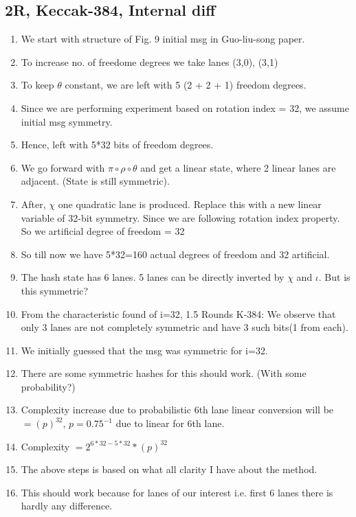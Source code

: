 \documentclass{article}
\begin{document}
\subsection{2R, Keccak-384, Internal diff}
\begin{enumerate}
    \item We start with structure of Fig. 9 initial msg in Guo-liu-song paper.
    \item To increase no. of freedome degrees we take lanes (3,0), (3,1)
    \item To keep $\theta$ constant, we are left with 5 (2 + 2 + 1) freedom degrees.
    \item Since we are performing experiment based on rotation index = 32, we assume initial msg symmetry.
    \item Hence, left with 5*32 bits of freedom degrees.
    \item We go forward with $\pi \circ \rho \circ \theta$ and get a linear state, where 2 linear lanes are adjacent. (State is still symmetric).
    \item After, $\chi$ one quadratic lane is produced. Replace this with a new linear variable of 32-bit symmetry. Since we are following rotation index property. So we artificial degree of freedom = 32
    \item So till now we have 5*32=160 actual degrees of freedom and 32 artificial.
    \item The hash state has 6 lanes. 5 lanes can be directly inverted by $\chi$ and $\iota$. But is this symmetric?
    \item From the characteristic found of i=32, 1.5 Rounds K-384: We observe that only 3 lanes are not completely symmetric and have 3 such bits(1 from each).
    \item We initially guessed that the msg was symmetric for i=32.
    \item There are some symmetric hashes for this should work. (With some probability?)
    \item Complexity increase due to probabilistic 6th lane linear conversion will be $ = (p)^{32}$, $p = 0.75^{-1}$ due to linear for 6th lane.
    \item Complexity $ = 2^{6*32 - 5*32} * (p)^{32} $
    \item The above steps is based on what all clarity I have about the method.
    \item This should work because for lanes of our interest i.e. first 6 lanes there is hardly any difference.
\end{enumerate}
\end{document}
